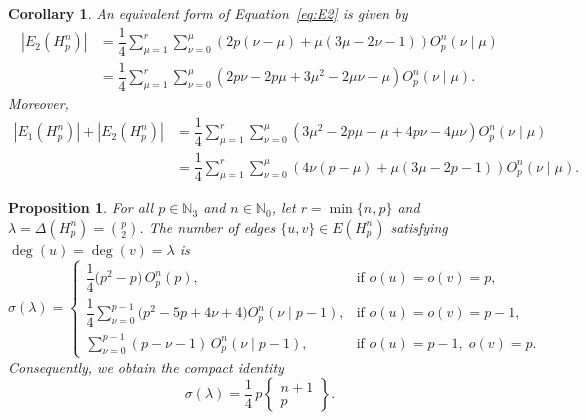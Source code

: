\documentclass[10pt,a4paper]{amsart}
\newtheorem{corollary}{Corollary}
\newtheorem{proposition}{Proposition}
\begin{document}
\begin{corollary}\label{coro:another_espression_of_E2}  
An equivalent form of Equation~\eqref{eq:E2} is given by
\begin{equation}
    \begin{aligned}
|E_2(H_p^n)|&=\dfrac{1}{4} \sum_{\mu = 1}^{r}  \sum_{\nu = 0}^{\mu} \left( 2p(\nu- \mu)  + \mu( 3\mu- 2\nu - 1) \right) O_p^n(\nu \mid \mu)\\
&=\dfrac{1}{4} \sum_{\mu = 1}^{r}  \sum_{\nu = 0}^{\mu} \left( 2p\nu- 2p\mu  + 3\mu^2- 2\mu\nu - \mu \right) O_p^n(\nu \mid \mu).
\end{aligned}
\end{equation}
Moreover,
\begin{equation}
    \begin{aligned}
|E_1(H_p^n)|+ |E_2(H_p^n)|
&= \dfrac{1}{4} \sum_{\mu = 1}^{r}  \sum_{\nu = 0}^{\mu} \left( 3\mu^{2} -2p\mu-\mu+4p\nu-4\mu\nu \right) O_p^n(\nu \mid \mu)\\
&= \dfrac{1}{4} \sum_{\mu = 1}^{r}  \sum_{\nu = 0}^{\mu} \left( 4\nu(p-\mu)+\mu(3\mu-2p-1)  \right) O_p^n(\nu \mid \mu).
\end{aligned}
\end{equation}
\end{corollary}

\begin{proposition}\label{prop:eqdeg-top}  
For all $p \in \mathbb{N}_3$ and $n \in \mathbb{N}_0$,  let $r = \min\{n, p\}$ and  $\lambda=\Delta(H_p^n)=\binom{p}{2}$.
The number of edges $\{u,v\}\in E(H_p^n)$ satisfying $\deg(u)=\deg(v)=\lambda$ is
\begin{equation}\label{eq:sigma-top}
         \sigma(\lambda)=\begin{cases}
             \dfrac{1}{4}  \bigl(p^{2} -p\bigr)\, O_p^n(p), & \text{if } o(u)=o(v)=p,\\[4pt]
             \dfrac{1}{4}   \displaystyle\sum_{\nu = 0}^{p-1} 
             \bigl(p^{2}-5p+4\nu+4\bigr) O_p^n(\nu \mid p-1),
             & \text{if } o(u)=o(v)=p-1,\\[8pt]
             \displaystyle\sum_{\nu = 0}^{p-1}  (p-\nu-1)\, O_p^n(\nu \mid p-1),
             & \text{if } o(u)=p-1,\; o(v)=p.
         \end{cases}
\end{equation}
Consequently, we obtain the compact identity
\begin{equation}
        \sigma(\lambda)
        = \dfrac{1}{4}\,p
          \begin{Bmatrix}
             n+1\\p
          \end{Bmatrix}.
\end{equation}
\end{proposition}
\end{document}

